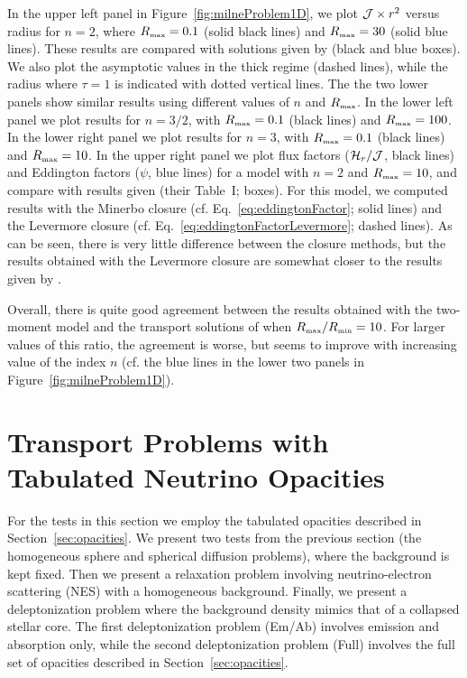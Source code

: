 \documentclass[10pt,preprint]{aastex}
\begin{document}
In the upper left panel in Figure~\ref{fig:milneProblem1D}, we plot $\mathcal{J}\times r^{2}$ versus radius for $n=2$, where $R_{\mbox{\tiny max}}=0.1$ (solid black lines) and $R_{\mbox{\tiny max}}=30$ (solid blue lines).  
These results are compared with solutions given by \citet{hummerRybicki_1971} (black and blue boxes).  
We also plot the asymptotic values in the thick regime (dashed lines), while the radius where $\tau=1$ is indicated with dotted vertical lines.  
The the two lower panels show similar results using different values of $n$ and $R_{\mbox{\tiny max}}$.  
In the lower left panel we plot results for $n=3/2$, with $R_{\mbox{\tiny max}}=0.1$ (black lines) and $R_{\mbox{\tiny max}}=100$.  
In the lower right panel we plot results for $n=3$, with $R_{\mbox{\tiny max}}=0.1$ (black lines) and $R_{\mbox{\tiny max}}=10$.  
In the upper right panel we plot flux factors ($\mathcal{H}_{r}/\mathcal{J}$, black lines) and Eddington factors ($\psi$, blue lines) for a model with $n=2$ and $R_{\mbox{\tiny max}}=10$, and compare with results given \citet{hummerRybicki_1971} (their Table~I; boxes).  
For this model, we computed results with the Minerbo closure (cf. Eq.~\eqref{eq:eddingtonFactor}; solid lines) and the Levermore closure (cf. Eq.~\eqref{eq:eddingtonFactorLevermore}; dashed lines).  
As can be seen, there is very little difference between the closure methods, but the results obtained with the Levermore closure are somewhat closer to the results given by \citet{hummerRybicki_1971}.  

Overall, there is quite good agreement between the results obtained with the two-moment model and the transport solutions of \citet{hummerRybicki_1971} when $R_{\mbox{\tiny max}}/R_{\mbox{\tiny min}}=10$.  
For larger values of this ratio, the agreement is worse, but seems to improve with increasing value of the index $n$ (cf. the blue lines in the lower two panels in Figure~\ref{fig:milneProblem1D}).  

\section{Transport Problems with Tabulated Neutrino Opacities}
\label{sec:numericalTableOpacities}

For the tests in this section we employ the tabulated opacities described in Section~\ref{sec:opacities}.  
We present two tests from the previous section (the homogeneous sphere and spherical diffusion problems), where the background is kept fixed.  
Then we present a relaxation problem involving neutrino-electron scattering (NES) with a homogeneous background.  
Finally, we present a deleptonization problem where the background density mimics that of a collapsed stellar core.  
The first deleptonization problem (Em/Ab) involves emission and absorption only, while the second deleptonization problem (Full) involves the full set of opacities described in Section~\ref{sec:opacities}.  
\end{document}
